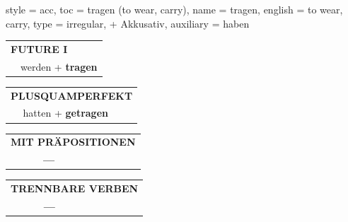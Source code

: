 \begin{verbentry}{
  style = {acc},
  toc = {tragen (to wear, carry)},
  name = {tragen},
  english = {to wear, carry},
  type = {irregular, + Akkusativ},
  auxiliary = {haben}
}
\begin{tabular}{rl}
    \multicolumn{2}{l}{\textbf{FUTURE I} }\\
   & werden + \textbf{tragen}\\
 
  \end{tabular}
\hfill
   \begin{tabular}{rl}
      \multicolumn{2}{l}{\textbf{PLUSQUAMPERFEKT}}\\
   & hatten + \textbf{getragen}\\
  \end{tabular}
  
  
\vspace{10pt}

\begin{tabular}{lll}
\multicolumn{3}{l}{\textbf{MIT PRÄPOSITIONEN}}\\
& \textbf{---} & \\
\end{tabular}
\hfill
\begin{tabular}{lll}
\multicolumn{3}{l}{\textbf{TRENNBARE VERBEN}}\\
& \textbf{---} & \\
\end{tabular}
\vspace{-5pt}
\end{verbentry}

